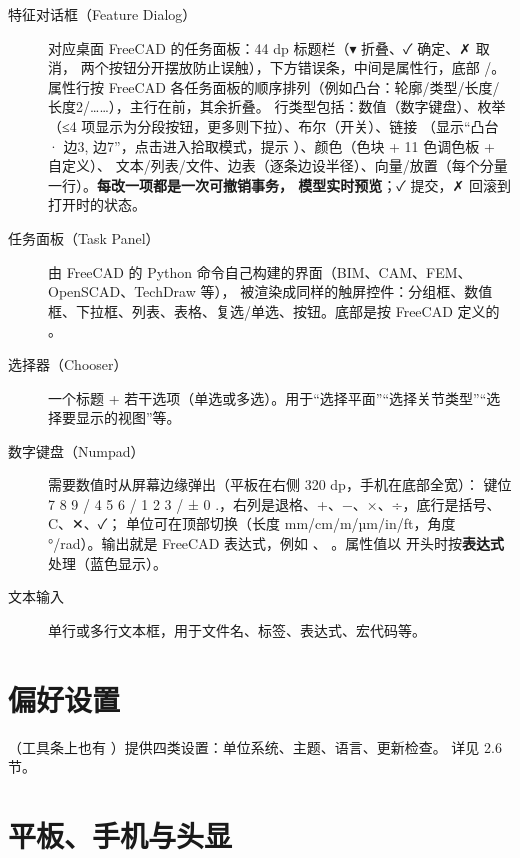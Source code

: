 \begin{description}
  \item[特征对话框（Feature Dialog）] 对应桌面 FreeCAD 的任务面板：44 dp 标题栏（▾ 折叠、✓ 确定、✗ 取消，
        两个按钮分开摆放防止误触），下方错误条，中间是属性行，底部 /。
        属性行按 FreeCAD 各任务面板的顺序排列（例如凸台：轮廓/类型/长度/长度2/……），主行在前，其余折叠。
        行类型包括：数值（数字键盘）、枚举（≤4 项显示为分段按钮，更多则下拉）、布尔（开关）、链接
        （显示“凸台 · 边3, 边7”，点击进入拾取模式，提示 ）、颜色（色块 + 11 色调色板 + 自定义）、
        文本/列表/文件、边表（逐条边设半径）、向量/放置（每个分量一行）。\textbf{每改一项都是一次可撤销事务，
        模型实时预览}；✓ 提交，✗ 回滚到打开时的状态。
  \item[任务面板（Task Panel）] 由 FreeCAD 的 Python 命令自己构建的界面（BIM、CAM、FEM、OpenSCAD、TechDraw 等），
        被渲染成同样的触屏控件：分组框、数值框、下拉框、列表、表格、复选/单选、按钮。底部是按 FreeCAD 定义的
        。
  \item[选择器（Chooser）] 一个标题 + 若干选项（单选或多选）。用于“选择平面”“选择关节类型”“选择要显示的视图”等。
  \item[数字键盘（Numpad）] 需要数值时从屏幕边缘弹出（平板在右侧 320 dp，手机在底部全宽）：
        键位 7 8 9 / 4 5 6 / 1 2 3 / ± 0 .，右列是退格、+、−、×、÷，底行是括号、C、✕、✓；
        单位可在顶部切换（长度 mm/cm/m/µm/in/ft，角度 °/rad）。输出就是 FreeCAD 表达式，例如 \file{25 mm}、
        。属性值以 \file{=} 开头时按\textbf{表达式}处理（蓝色显示）。
  \item[文本输入] 单行或多行文本框，用于文件名、标签、表达式、宏代码等。
\end{description}


\section{偏好设置}

（工具条上也有 ）提供四类设置：单位系统、主题、语言、更新检查。
详见 2.6 节。

\section{平板、手机与头显}

